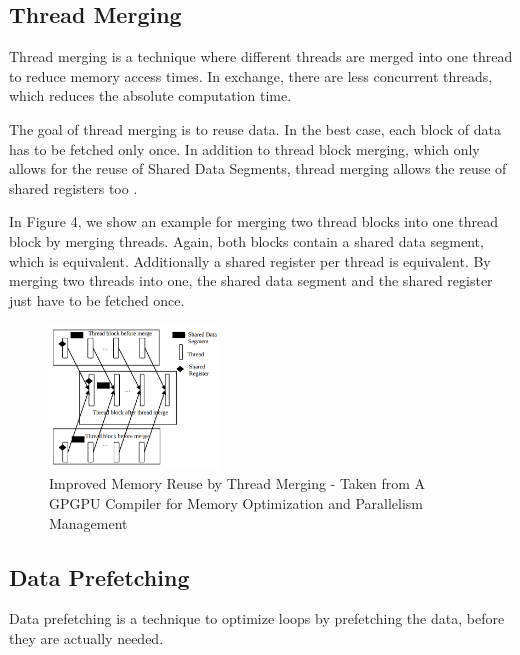 \documentclass[conference]{IEEEtran}
\begin{document}
	\subsection{Thread Merging}
	
	
	Thread merging is a technique where different threads are merged into one thread to reduce memory access times. In exchange, there are less concurrent threads, which reduces the absolute computation time.
	
		

	The goal of thread merging is to reuse data. In the best case, each block of data has to be fetched only once. In addition to thread block merging, which only allows for the reuse of Shared Data Segments, thread merging allows the reuse of shared registers too \cite{yang2010gpgpu}. 
	
	
	In Figure 4, we show an example for merging two thread blocks into one thread block by merging threads. Again, both blocks contain a shared data segment, which is equivalent. Additionally a shared register per thread is equivalent. By merging two threads into one, the shared data segment and the shared register just have to be fetched once.
	
	\begin{figure}[htbp]
		\centerline{\includegraphics[width=0.4\textwidth]{ThreadMerge.png}}
		\caption{Improved Memory Reuse by Thread Merging - Taken from  A GPGPU Compiler for Memory Optimization and Parallelism Management}
		\label{fig2}
	\end{figure}
	


	\subsection{Data Prefetching}
		
		
		Data prefetching is a technique to optimize loops by prefetching the data, before they are actually needed.
		
\end{document}
